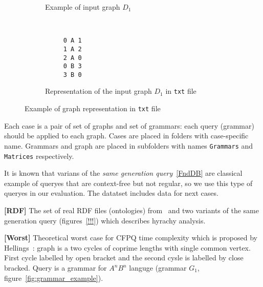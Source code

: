 \begin{figure}[h]
    \centering
    \begin{subfigure}[b]{0.24\textwidth}
        \centering

        \caption{Example of input graph $D_1$}
    \end{subfigure}%
    ~ 
    \begin{subfigure}[b]{0.24\textwidth}
        \centering
         \begin{verbatim}
     0 A 1
     1 A 2
     2 A 0
     0 B 3
     3 B 0
 \end{verbatim} 

        \caption{Representation of the input graph $D_1$ in \texttt{txt} file}
    \end{subfigure}
    \caption{Example of graph representation in \texttt{txt} file}
    \label{fig:graph_example}
\end{figure}

Each case is a pair of set of graphs and set of grammars: each query (grammar) should be applied to each graph.
Cases are placed in folders with case-specific name.
Grammars and graph are placed in subfolders with names \verb|Grammars| and \verb|Matrices| respectively.


It is known that varians of the \textit{same generation query}~\ref{FndDB} are classical example of queryes that are context-free but not regular, so we use this type of queryes in our evaluation.
The datatset includes data for next cases.

\textbf{[RDF]} The set of real RDF files (ontologies) from~\cite{RDF} and two variants of the same generation query (figures~\ref{!!!}) which describes hyrachy analysis.

\textbf{[Worst]} Theoretical worst case for CFPQ time complexity which is proposed by Hellings~\cite{hellingsPathQuerying}: graph is a two cycles of coprime lengths with single common vertex.
First cycle labelled by open bracket and the second cysle is labelled by close bracked.
Query is a grammar for $A^nB^n$ languge (grammar $G_1$, figure~\ref{fig:grammar_example}).


